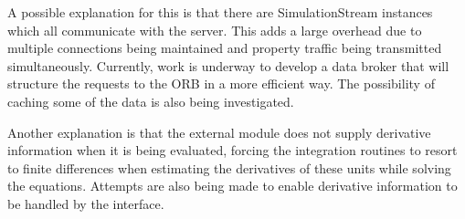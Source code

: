 A possible explanation for this is that there are SimulationStream instances which all communicate with the server.  
This adds a large overhead due to multiple connections being maintained and property traffic being transmitted simultaneously.  
Currently, work is underway to develop a data broker that will structure the requests to the ORB in a more efficient way.  
The possibility of caching some of the data is also being investigated.

Another explanation is that the external module does not supply derivative information when it is being evaluated, forcing the integration routines to resort to finite differences when estimating the derivatives of these units while solving the equations.  
Attempts are also being made to enable derivative information to be handled by the interface.

